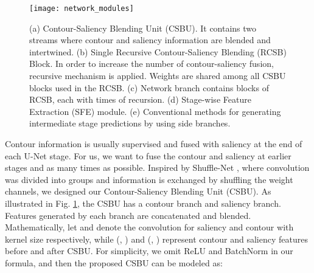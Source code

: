 \documentclass[10pt,twocolumn,letterpaper]{article}
\begin{document}
\begin{figure*}[!h]
 \texttt{[image: network\_modules]}
\begin{subfigure}{.24\linewidth}
\caption{}
\label{fig:CSB}
\end{subfigure}
\begin{subfigure}{.18\linewidth}
\caption{}
\label{fig:CSBU}
\end{subfigure}
\begin{subfigure}{.13\linewidth}
\caption{}
\label{fig:RCSB}
\end{subfigure}
\begin{subfigure}{.16\linewidth}
\caption{}
\label{fig:SFE}
\end{subfigure}
\begin{subfigure}{.25\linewidth}
\caption{}
\label{fig:convention}
\end{subfigure}
\vspace{-0.02\linewidth}
\caption{(a) Contour-Saliency Blending Unit (CSBU). It contains two streams where contour and saliency information are blended and intertwined. (b) Single Recursive Contour-Saliency Blending (RCSB) Block. In order to increase the number of contour-saliency fusion, recursive mechanism is applied. Weights are shared among all CSBU blocks used in the RCSB. (c) Network branch contains  blocks of RCSB, each with  times of recursion. (d) Stage-wise Feature Extraction (SFE) module. (e) Conventional methods for generating intermediate stage predictions by using side branches. }
\label{fig:network_modules}
\end{figure*}

\label{CSB}
Contour information is usually supervised and fused with saliency at the end of each U-Net stage. For us, we want to fuse the contour and saliency at earlier stages and as many times as possible. Inspired by Shuffle-Net \cite{SHUFFLENET}, where convolution was divided into groups and information is exchanged by shuffling the weight channels, we designed our Contour-Saliency Blending Unit (CSBU). As illustrated in Fig. \ref{fig:CSB}, the CSBU has a contour branch and saliency branch. Features generated by each branch are concatenated and blended. Mathematically, let  and  denote the convolution for saliency and contour with kernel size  respectively, while (, ) and (, ) represent contour and saliency features before and after CSBU. For simplicity, we omit ReLU \cite{RELU} and BatchNorm \cite{BN} in our formula, and then the proposed CSBU can be modeled as:
\end{document}
